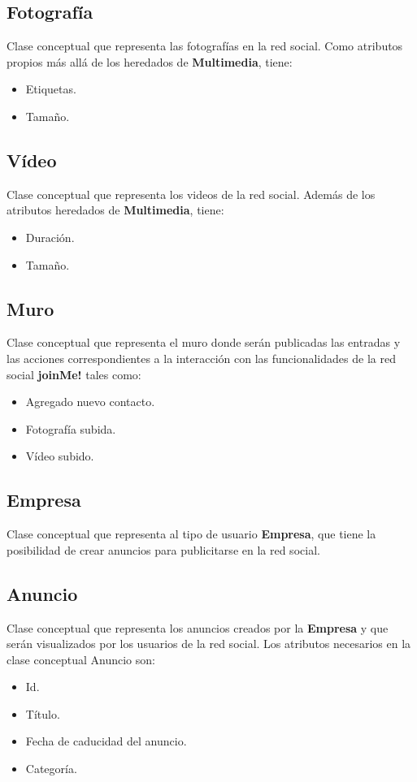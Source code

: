 \documentclass[12pt, a4paper, titlepage]{article}
\begin{document}
\subsection{Fotografía}
	Clase conceptual que representa las fotografías en la red social. Como atributos propios más allá de los heredados de \textbf{Multimedia}, tiene:
	\begin{itemize}
		\item Etiquetas.
		\item Tamaño.
	\end{itemize}
\subsection{Vídeo}
	Clase conceptual que representa los videos de la red social. Además de los atributos heredados de \textbf{Multimedia}, tiene:
	\begin{itemize}
		\item Duración.
		\item Tamaño.
	\end{itemize}
\subsection{Muro}
	Clase conceptual que representa el muro donde serán publicadas las entradas y las acciones correspondientes a la interacción con las funcionalidades de la red social \textbf{joinMe!} tales como:
	\begin{itemize}
		\item Agregado nuevo contacto.
		\item Fotografía subida.
		\item Vídeo subido.
	\end{itemize}
\subsection{Empresa}
	Clase conceptual que representa al tipo de usuario \textbf{Empresa}, que tiene la posibilidad de crear anuncios para publicitarse en la red social.
\subsection{Anuncio}
	Clase conceptual que representa los anuncios creados por la \textbf{Empresa} y que serán visualizados por los usuarios de la red social. Los atributos necesarios en la clase conceptual Anuncio son:
	\begin{itemize}
		\item Id.
		\item Título.
		\item Fecha de caducidad del anuncio.
		\item Categoría.
	\end{itemize}
\end{document}
